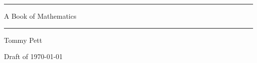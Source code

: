 \documentclass{mathbook}
\begin{document}
\frontmatter
\begin{titlepage}
  \centering
  \vspace*{0.25\textheight}
  \rule{\textwidth}{0.6pt}\par\vspace{3ex}
  {\fontsize{28}{34}\selectfont A Book of Mathematics\par}
  \vspace{3ex}\rule{\textwidth}{0.6pt}\par
  \vspace{6ex}
  {\Large Tommy Pett\par}
  \vfill
  {\large Draft of \today\par}
\end{titlepage}

\tableofcontents


\mainmatter




\backmatter
% 
% 
\end{document}
